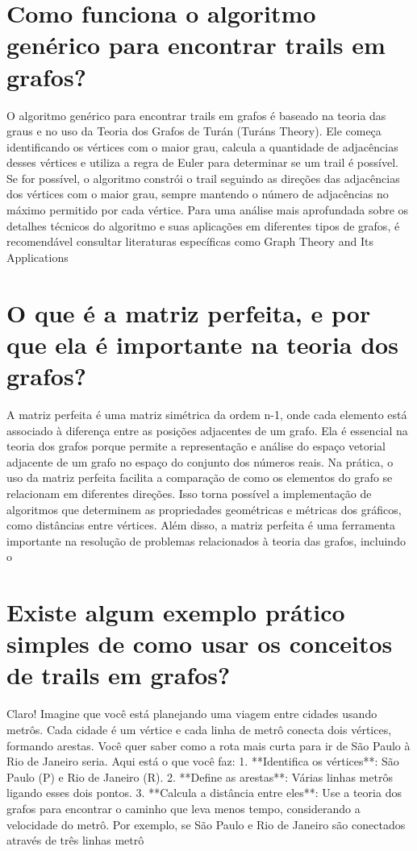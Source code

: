 \documentclass[11pt,a4paper]{article}
\begin{document}
\section{Como funciona o algoritmo genérico para encontrar trails em grafos?}
O algoritmo genérico para encontrar trails em grafos é baseado na teoria das graus e no uso da Teoria dos Grafos de Turán (Turáns Theory). Ele começa identificando os vértices com o maior grau, calcula a quantidade de adjacências desses vértices e utiliza a regra de Euler para determinar se um trail é possível. Se for possível, o algoritmo constrói o trail seguindo as direções das adjacências dos vértices com o maior grau, sempre mantendo o número de adjacências no máximo permitido por cada vértice. Para uma análise mais aprofundada sobre os detalhes técnicos do algoritmo e suas aplicações em diferentes tipos de grafos, é recomendável consultar literaturas específicas como Graph Theory and Its Applications

\section{O que é a matriz perfeita, e por que ela é importante na teoria dos grafos?}
A matriz perfeita é uma matriz simétrica da ordem n-1, onde cada elemento está associado à diferença entre as posições adjacentes de um grafo. Ela é essencial na teoria dos grafos porque permite a representação e análise do espaço vetorial adjacente de um grafo no espaço do conjunto dos números reais. Na prática, o uso da matriz perfeita facilita a comparação de como os elementos do grafo se relacionam em diferentes direções. Isso torna possível a implementação de algoritmos que determinem as propriedades geométricas e métricas dos gráficos, como distâncias entre vértices. Além disso, a matriz perfeita é uma ferramenta importante na resolução de problemas relacionados à teoria das grafos, incluindo o

\section{Existe algum exemplo prático simples de como usar os conceitos de trails em grafos?}
Claro! Imagine que você está planejando uma viagem entre cidades usando metrôs. Cada cidade é um vértice e cada linha de metrô conecta dois vértices, formando arestas. Você quer saber como a rota mais curta para ir de São Paulo à Rio de Janeiro seria. Aqui está o que você faz: 1. **Identifica os vértices**: São Paulo (P) e Rio de Janeiro (R). 2. **Define as arestas**: Várias linhas metrôs ligando esses dois pontos. 3. **Calcula a distância entre eles**: Use a teoria dos grafos para encontrar o caminho que leva menos tempo, considerando a velocidade do metrô. Por exemplo, se São Paulo e Rio de Janeiro são conectados através de três linhas metrô
\end{document}
